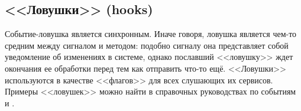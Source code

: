 \subsection*{<<Ловушки>> (hooks)}
Событие-ловушка является синхронным. Иначе говоря, ловушка является чем-то средним между сигналом и методом: подобно сигналу она представляет собой уведомление об изменениях в системе, однако пославший <<ловушку>> ждет окончания ее обработки перед тем как отправить что-то ещё. <<Ловушки>> используются в качестве <<флагов>> для всех слушающих их сервисов. Примеры <<ловушек>> можно найти в справочных руководствах по событиям  и .   